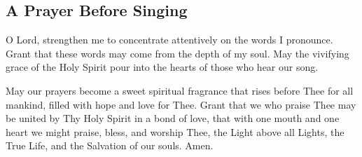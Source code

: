 \subsection{A Prayer Before Singing}

O Lord, strengthen me to concentrate attentively on the words I pronounce. Grant that these words may come from the depth of my soul. May the vivifying grace of the Holy Spirit pour into the hearts of those who hear our song.

May our prayers become a sweet spiritual fragrance that rises before Thee for all mankind, filled with hope and love for Thee. Grant that we who praise Thee may be united by Thy Holy Spirit in a bond of love, that with one mouth and one heart we might praise, bless, and worship Thee, the Light above all Lights, the True Life, and the Salvation of our souls. Amen.

\cleardoublepage
